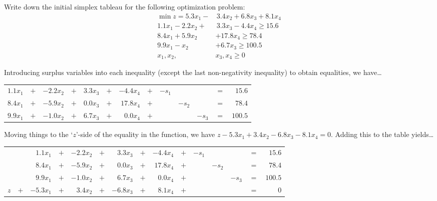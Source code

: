 \documentclass[11pt,letterpaper]{article}
\begin{document}

 Write down the initial simplex tableau for the following optimization problem:
	\[
	\begin{aligned}
	\min z= 5.3x_1 - &\,3.4x_2 + 6.8x_3 + 8.1x_4 \\
	1.1x_1 - 2.2x_2 + &\,3.3x_3 - 4.4x_4 \geq 15.6 \\
	8.4x_1 + 5.9x_2 &+ 17.8x_4 \geq 78.4 \\
	9.9x_1 - x_2 &+ 6.7 x_3 \geq 100.5 \\
	x_1, x_2, \,&x_3, x_4 \geq 0 
	\end{aligned}
	\] \pspace

\sol Introducing surplus variables into each inequality (except the last non-negativity inequality) to obtain equalities, we have\dots \par
	\begin{table}[!ht]
	\centering
	\begin{tabular}{rrrrrrrrrrrrr}
	$1.1x_1$ & $+$ & $-2.2x_2$ & $+$ & $3.3x_3$ & $+$ & $-4.4x_4$ & $+$ & $-s_1$ & & & $=$ & $15.6$ \\
	$8.4x_1$ & $+$ & $-5.9x_2$ & $+$ & $0.0x_3$ & $+$ & $17.8x_4$ & $+$ & & $-s_2$ & & $=$ & $78.4$ \\
	$9.9x_1$ & $+$ & $-1.0x_2$ & $+$ & $6.7x_3$ & $+$ & $0.0x_4$ & $+$ & & & $-s_3$ & $=$ & $100.5$
	\end{tabular}
	\end{table} \par
Moving things to the `$z$'-side of the equality in the function, we have $z - 5.3x_1 + 3.4x_2 - 6.8x_3 - 8.1x_4= 0$. Adding this to the table yields\dots \par
	\begin{table}[!ht]
	\centering
	\begin{tabular}{rrrrrrrrrrrrrrr}
	&&$1.1x_1$ & $+$ & $-2.2x_2$ & $+$ & $3.3x_3$ & $+$ & $-4.4x_4$ & $+$ & $-s_1$ & & & $=$ & $15.6$ \\
	&&$8.4x_1$ & $+$ & $-5.9x_2$ & $+$ & $0.0x_3$ & $+$ & $17.8x_4$ & $+$ & & $-s_2$ & & $=$ & $78.4$ \\
	&&$9.9x_1$ & $+$ & $-1.0x_2$ & $+$ & $6.7x_3$ & $+$ & $0.0x_4$ & $+$ & & & $-s_3$ & $=$ & $100.5$ \\
	$z$ & $+$ & $-5.3x_1$ & $+$ & $3.4x_2$ & $+$ & $-6.8x_3$ & $+$ & $8.1x_4$ & $+$ & & & & $=$ & $0$
	\end{tabular}
	\end{table} \par
\end{document}
